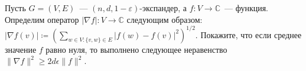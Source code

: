 Пусть $G = (V, E)$~--- $(n, d, 1 - \varepsilon)$-экспандер, а $f \colon V \rightarrow \mathbb{C}$~---
функция. Определим оператор $|\nabla f| \colon V \rightarrow \mathbb{C}$ следующим образом:
$|\nabla f(v)| \coloneqq (\sum\limits_{w \in V: \{v, w\} \in E} |f(w) - f(v)|^2)^{1 / 2}$. Покажите, что
если среднее значение $f$ равно нуля, то выполнено следующее неравенство
$\| \nabla f \|^2 \ge 2 d \epsilon \| f \|^2$.
